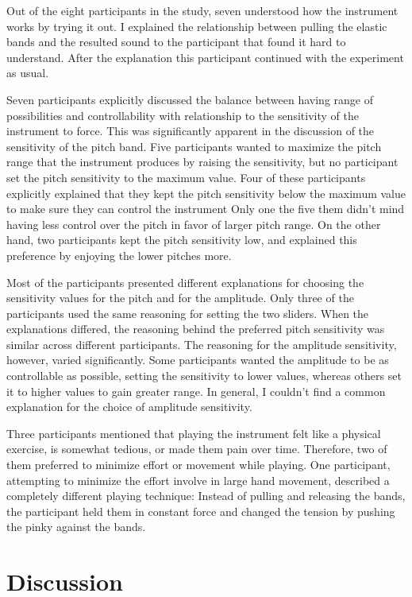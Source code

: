 \documentclass{sigchi}
\begin{document}
Out of the eight participants in the study, seven understood how the instrument works by trying it out.
I explained the relationship between pulling the elastic bands and the resulted sound to the participant that found it hard to understand.
After the explanation this participant continued with the experiment as usual.

Seven participants explicitly discussed the balance between having range of possibilities and controllability with relationship to the sensitivity of the instrument to force.
This was significantly apparent in the discussion of the sensitivity of the pitch band.
Five participants wanted to maximize the pitch range that the instrument produces by raising the sensitivity, but no participant set the pitch sensitivity to the maximum value.
Four of these participants explicitly explained that they kept the pitch sensitivity below the maximum value to make sure they can control the instrument
Only one the five them didn't mind having less control over the pitch in favor of larger pitch range.
On the other hand, two participants kept the pitch sensitivity low, and explained this preference by enjoying the lower pitches more.

Most of the participants presented different explanations for choosing the sensitivity values for the pitch and for the amplitude.
Only three of the participants used the same reasoning for setting the two sliders.
When the explanations differed, the reasoning behind the preferred pitch sensitivity was similar across different participants.
The reasoning for the amplitude sensitivity, however, varied significantly.
Some participants wanted the amplitude to be as controllable as possible, setting the sensitivity to lower values, whereas others set it to higher values to gain greater range.
In general, I couldn't find a common explanation for the choice of amplitude sensitivity.

Three participants mentioned that playing the instrument felt like a physical exercise, is somewhat tedious, or made them pain over time.
Therefore, two of them preferred to minimize effort or movement while playing.
One participant, attempting to minimize the effort involve in large hand movement, described a completely different playing technique:
Instead of pulling and releasing the bands, the participant held them in constant force and changed the tension by pushing the pinky against the bands.

\section{Discussion}
\end{document}
